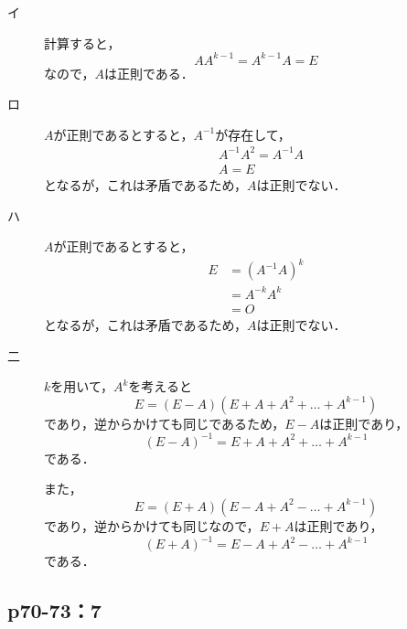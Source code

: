\documentclass[uplatex,dvipdfmx,a4paper,11pt,fleqn]{jsarticle}
\begin{document}
    \begin{leftbar}
        \begin{description}
            \item[イ] 計算すると，
            \[
                A A^{k-1} = A^{k-1} A = E
            \]
            なので，$A$は正則である．
            \item[ロ] $A$が正則であるとすると，$A^{-1}$が存在して，
            \begin{align*}
                & A^{-1} A^{2} = A^{-1} A \\
                & A = E 
            \end{align*} 
            となるが，これは矛盾であるため，$A$は正則でない．
            \item[ハ] $A$が正則であるとすると，
            \begin{align*} 
                E & = (A^{-1} A)^{k} \\
                & = A^{-k} A^{k} \\
                & = O 
            \end{align*} 
            となるが，これは矛盾であるため，$A$は正則でない．
            \item[二] $k$を用いて，$A^k$を考えると
            \[
                E = (E-A)(E+A+A^2+\dots+A^{k-1})
            \]
            であり，逆からかけても同じであるため，$E-A$は正則であり，
            \[
                (E-A)^{-1}=E+A+A^2+\dots+A^{k-1}
            \]
            である．

            また，
            \[
                E=(E+A)(E-A+A^2-\dots+A^{k-1})
            \]
            であり，逆からかけても同じなので，$E+A$は正則であり，
            \[
                (E+A)^{-1} = E-A+A^2-\dots+A^{k-1}
            \]
            である．
        \end{description}
    \end{leftbar}

    \newpage 

\subsection*{p70-73：7}
\end{document}
